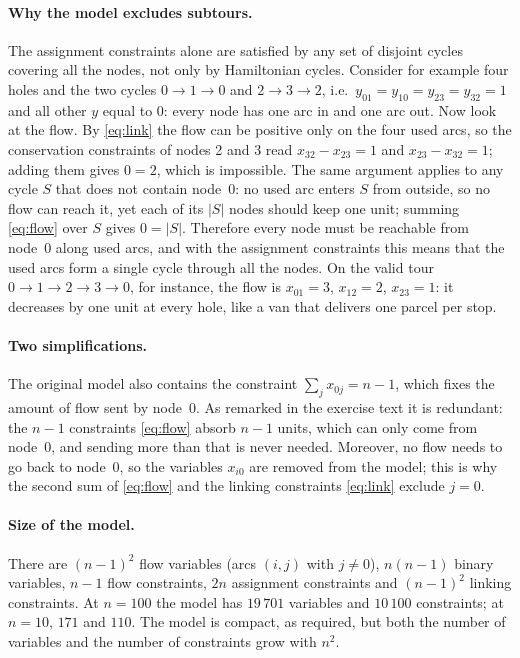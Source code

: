 \documentclass[11pt,a4paper]{article}
\begin{document}
\paragraph{Why the model excludes subtours.}
The assignment constraints alone are satisfied by any set of disjoint cycles covering all
the nodes, not only by Hamiltonian cycles. Consider for example four holes and the two cycles
$0\to1\to0$ and $2\to3\to2$, i.e.\ $y_{01}=y_{10}=y_{23}=y_{32}=1$ and all other $y$ equal to
0: every node has one arc in and one arc out. Now look at the flow. By \eqref{eq:link} the
flow can be positive only on the four used arcs, so the conservation constraints of nodes 2
and 3 read $x_{32}-x_{23}=1$ and $x_{23}-x_{32}=1$; adding them gives $0=2$, which is
impossible. The same argument applies to any cycle $S$ that does not contain node~0: no
used arc enters $S$ from outside, so no flow can reach it, yet each of its $|S|$ nodes should
keep one unit; summing \eqref{eq:flow} over $S$ gives $0=|S|$. Therefore every node must be
reachable from node~0 along used arcs, and with the assignment constraints this means that
the used arcs form a single cycle through all the nodes. On the valid tour $0\to1\to2\to3\to0$,
for instance, the flow is $x_{01}=3$, $x_{12}=2$, $x_{23}=1$: it decreases by one unit at
every hole, like a van that delivers one parcel per stop.

\paragraph{Two simplifications.}
The original model also contains the constraint $\sum_j x_{0j}=n-1$, which fixes the amount
of flow sent by node~0. As remarked in the exercise text it is redundant: the $n-1$
constraints \eqref{eq:flow} absorb $n-1$ units, which can only come from node~0, and sending
more than that is never needed. Moreover, no flow needs to go back to node~0, so the variables
$x_{i0}$ are removed from the model; this is why the second sum of \eqref{eq:flow} and the
linking constraints \eqref{eq:link} exclude $j=0$.

\paragraph{Size of the model.}
There are $(n-1)^2$ flow variables (arcs $(i,j)$ with $j\neq0$), $n(n-1)$ binary variables,
$n-1$ flow constraints, $2n$ assignment constraints and $(n-1)^2$ linking constraints. At
$n=100$ the model has $19\,701$ variables and $10\,100$ constraints; at $n=10$, $171$ and
$110$. The model is compact, as required, but both the number of variables and the number of
constraints grow with $n^2$.
\end{document}
